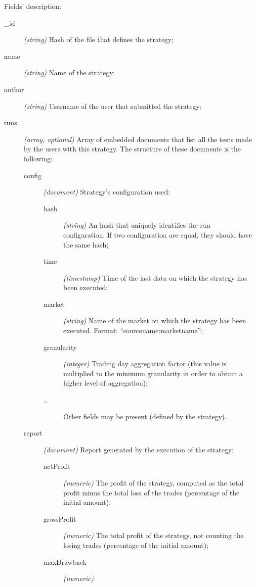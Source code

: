 Fields' description:
\begin{description}
	\item[\_id] \textit{(string)} Hash of the file that defines the
		strategy;
	\item[name] \textit{(string)} Name of the strategy;
	\item[author] \textit{(string)} Username of the user that submitted the
		strategy;
	\item[runs] \textit{(array, optional)} Array of embedded documents that
		list all the tests made by the users with this strategy. The
		structure of these documents is the following:
		\begin{description}
			\item[config] \textit{(document)} Strategy's
				configuration used:
				\begin{description}
					\item[hash] \textit{(string)} An hash
						that uniquely identifies the
						run configuration. If two
						configuration are equal, they
						should have the same hash;
					\item[time]
						\textit{(timestamp)} Time of the
						last data on which the strategy
						has been executed;
					\item[market] \textit{(string)} Name of
						the market on which the strategy
						has been executed. Format:
						\enquote{sourcename:marketname};
					\item[granularity] \textit{(integer)}
						Trading day aggregation factor
						(this value is multiplied to the
						minimum granularity in order to
						obtain a higher level of
						aggregation);
					\item[\ldots] Other fields may be
						present (defined by the
						strategy).
				\end{description}
			\item[report] \textit{(document)} Report generated by
				the execution of the strategy:
				\begin{description}
					\item[netProfit] \textit{(numeric)}
						The profit of the strategy,
						computed as the total profit
						minus the total loss of the
						trades (percentage of the
						initial amount);
					\item[grossProfit] \textit{(numeric)}
						The total profit of the
						strategy, not counting the
						losing trades (percentage of the
						initial amount);
					\item[maxDrawback] \textit{(numeric)}

\end{description}
\end{description}
\end{description}
